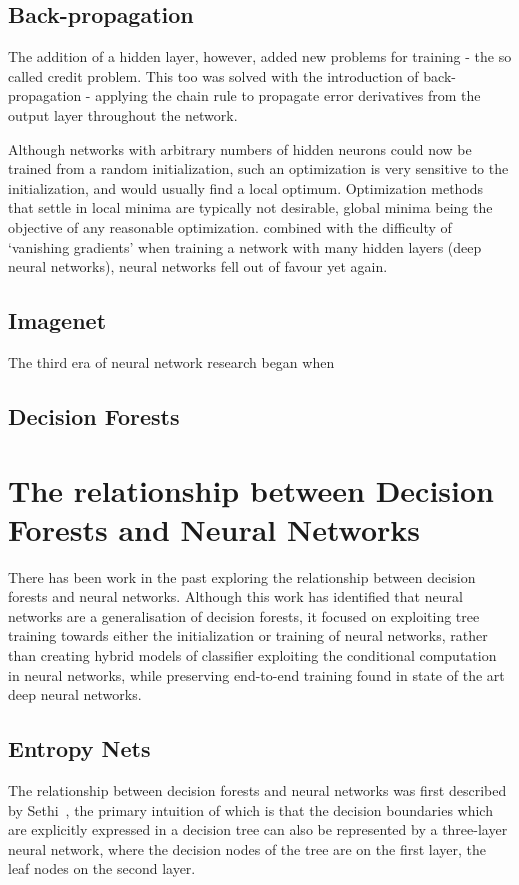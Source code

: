 \documentclass[thesis]{subfiles}
\begin{document}
\subsection{Back-propagation}
The addition of a hidden layer, however, added new problems for training - the so called credit problem. This too was solved with the introduction of back-propagation - applying the chain rule to propagate error derivatives from the output layer throughout the network. 

Although networks with arbitrary numbers of hidden neurons could now be trained from a random initialization, such an optimization is very sensitive to the initialization, and would usually find a local optimum. Optimization methods that settle in local minima are typically not desirable, global minima being the objective of any reasonable optimization. combined with the difficulty of `vanishing gradients' when training a network with many hidden layers (\ie deep neural networks), neural networks fell out of favour yet again.

\subsection{Imagenet}
The third era of neural network research began when 

\subsection{Decision Forests}

\section{The relationship between Decision Forests and Neural Networks}
There has been work in the past exploring the relationship between decision forests and neural networks. Although this work has identified that neural networks are a generalisation of decision forests, it focused on exploiting tree training towards either the initialization or training of neural networks, rather than creating hybrid models of classifier exploiting the conditional computation in neural networks, while preserving end-to-end training found in state of the art deep neural networks.

\subsection{Entropy Nets}
The relationship between decision forests and neural networks was first described by Sethi~\cite{Sethi1990}, the primary intuition of which is that the decision boundaries which are explicitly expressed in a decision tree can also be represented by a three-layer neural network, where the decision nodes of the tree are on the first layer, the leaf nodes on the second layer.
\end{document}
